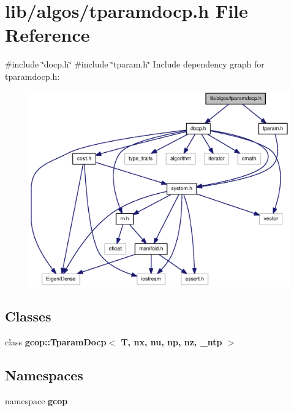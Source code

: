 \section{lib/algos/tparamdocp.h \-File \-Reference}
\label{tparamdocp_8h}
{\ttfamily \#include \char`\"{}docp.\-h\char`\"{}}\*
{\ttfamily \#include \char`\"{}tparam.\-h\char`\"{}}\*
\-Include dependency graph for tparamdocp.\-h\-:
\nopagebreak
\begin{figure}[H]
\begin{center}
\leavevmode
\includegraphics[width=350pt]{tparamdocp_8h__incl}
\end{center}
\end{figure}
\subsection*{\-Classes}
\begin{DoxyCompactItemize}
\item 
class {\bf gcop\-::\-Tparam\-Docp$<$ T, nx, nu, np, nz, \-\_\-ntp $>$}
\end{DoxyCompactItemize}
\subsection*{\-Namespaces}
\begin{DoxyCompactItemize}
\item 
namespace {\bf gcop}
\end{DoxyCompactItemize}
